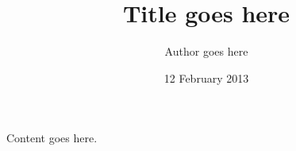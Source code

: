 \documentclass{article}
\title{Title goes here}
\author{Author goes here}
\date{12 February 2013}
\begin{document}
\begin{titlepage}
\maketitle
\end{titlepage}

Content goes here.
\end{document}
